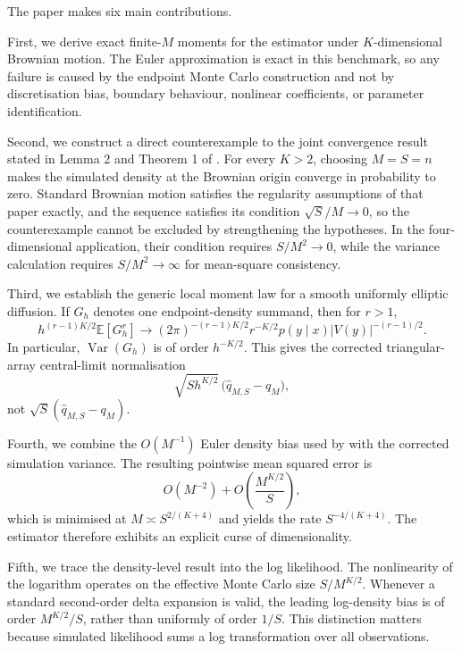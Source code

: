 \documentclass[11pt]{article}
\theoremstyle{definition}
\newcommand{\E}{\mathbb{E}}
\newcommand{\Var}{\operatorname{Var}}
\begin{document}
The paper makes six main contributions.

First, we derive exact finite-$M$ moments for the estimator under $K$-dimensional Brownian motion. The Euler approximation is exact in this benchmark, so any failure is caused by the endpoint Monte Carlo construction and not by discretisation bias, boundary behaviour, nonlinear coefficients, or parameter identification.

Second, we construct a direct counterexample to the joint convergence result stated in Lemma 2 and Theorem 1 of \citet{BrandtSantaClara2002}. For every $K>2$, choosing $M=S=n$ makes the simulated density at the Brownian origin converge in probability to zero. Standard Brownian motion satisfies the regularity assumptions of that paper exactly, and the sequence satisfies its condition $\sqrt{S}/M\to0$, so the counterexample cannot be excluded by strengthening the hypotheses. In the four-dimensional application, their condition requires $S/M^2\to0$, while the variance calculation requires $S/M^2\to\infty$ for mean-square consistency.

Third, we establish the generic local moment law for a smooth uniformly elliptic diffusion. If $G_h$ denotes one endpoint-density summand, then for $r>1$,
\[
h^{(r-1)K/2}\E[G_h^r]
\longrightarrow
(2\pi)^{-(r-1)K/2}r^{-K/2}
 p(y\mid x)|V(y)|^{-(r-1)/2}.
\]
In particular, $\Var(G_h)$ is of order $h^{-K/2}$. This gives the corrected triangular-array central-limit normalisation
\[
\sqrt{S h^{K/2}}\,\bigl(\widehat q_{M,S}-q_M\bigr),
\]
not $\sqrt{S}(\widehat q_{M,S}-q_M)$.

Fourth, we combine the $O(M^{-1})$ Euler density bias used by \citet{BrandtSantaClara2002} with the corrected simulation variance. The resulting pointwise mean squared error is
\[
O(M^{-2})+O\!\left(\frac{M^{K/2}}{S}\right),
\]
which is minimised at $M\asymp S^{2/(K+4)}$ and yields the rate $S^{-4/(K+4)}$. The estimator therefore exhibits an explicit curse of dimensionality.

Fifth, we trace the density-level result into the log likelihood. The nonlinearity of the logarithm operates on the effective Monte Carlo size $S/M^{K/2}$. Whenever a standard second-order delta expansion is valid, the leading log-density bias is of order $M^{K/2}/S$, rather than uniformly of order $1/S$. This distinction matters because simulated likelihood sums a log transformation over all observations.
\end{document}
